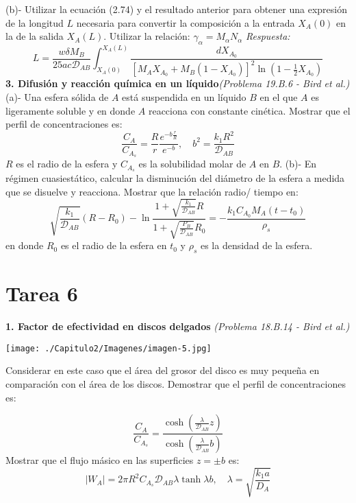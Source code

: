 (b)- Utilizar la ecuación (2.74) y el resultado anterior para obtener una expresión de la longitud \( L \) necesaria para convertir la composición a la entrada \( X_A(0) \) en la de la salida \( X_A(L) \). Utilizar la relación:\quad
    $
    \gamma_\alpha = M_\alpha N_\alpha
    $
\flushleft
\textit{Respuesta:}
  \[
    L = \frac{w \delta M_B}{25 a c\mathscr{D}_{AB}} \int_{X_A(0)}^{X_A(L)} \frac{dX_{A_0}}{\left[ {M_A X_{A_0} + M_B (1 - X_{A_0})} \right]^2 \ln \left( 1 - \frac{1}{2} X_{A_0} \right)}
    \]
\flushleft
\vspace{0.5cm} 
\textbf{3. Difusión y reacción química en un líquido}\textit{(Problema 19.B.6 - Bird et al.)}
\flushleft
(a)- Una esfera sólida de \( A \) está suspendida en un líquido \( B \) en el que \( A \) es ligeramente soluble y en donde \( A \) reacciona con constante cinética. Mostrar que el perfil de concentraciones es:
\[
    \frac{C_A}{C_{A_s}} = \frac{R}{r} \frac{e^{-b\frac{r}{R}}}{e^{-b}}, \quad b^2 = \frac{k_1R^{2}}{\mathscr{D}_{AB}}
    \]
 \( R \) es el radio de la esfera y \( C_{A_s} \) es la solubilidad molar de \( A \) en \( B \).
 \flushleft
 (b)-  En régimen cuasiestático, calcular la disminución del diámetro de la esfera a medida que se disuelve y reacciona.  Mostrar que la relación radio/ tiempo en: 
   \[
    \sqrt{\frac{k_1}{\mathscr{D}_{AB}}} (R - R_0) - \ln \frac{1 + \sqrt{\frac{k_1}{\mathscr{D}_{AB}}} R}{1 + \sqrt{\frac{P_B}{\mathscr{D}_{AB}}} R_0} = -\frac{k_1 C_{A_0} M_A (t - t_0)}{\rho_s}
    \]
en donde \( R_0 \) es el radio de la esfera en \( t_0 \) y \( \rho_s \) es la densidad de la esfera.
\newpage
\section*{Tarea 6}

\textbf{1. Factor de efectividad en discos delgados} \textit{(Problema 18.B.14 - Bird et al.)}
\flushleft
\begin{minipage}{0.4\textwidth} %
    \texttt{[image: ./Capitulo2/Imagenes/imagen-5.jpg]} %
\end{minipage}
\hfill %
\begin{minipage}{0.55\textwidth} %
Considerar en este caso que el área del grosor del disco es muy pequeña en comparación con el área de los discos. Demostrar que el perfil de concentraciones es:
\end{minipage}
\[
 \frac{C_A}{C_{A_s}} = \frac{\cosh \left(\frac{\lambda}{\mathscr{D}_{AB}} z\right)}{\cosh \left(\frac{\lambda}{\mathscr{D}_{AB}} b\right)}
    \]
Mostrar que el flujo másico en las superficies \( z = \pm b \)  es:
\[
    |W_A| = 2 \pi R^2 C_{A_s} \mathscr{D}_{AB} \lambda \tanh \lambda b, \quad \lambda=\sqrt{\frac{k_1a}{D_A}}
\]

